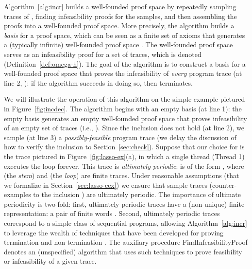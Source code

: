 \documentclass[9pt,nocopyrightspace]{sigplanconf}
\theoremstyle{definition}
\begin{document}
Algorithm~\ref{alg:incr} builds a well-founded proof space by repeatedly
sampling traces of , finding infeasibility proofs for the samples, and then
assembling the proofs into a well-founded proof space.  More precisely, the
algorithm builds a \emph{basis}  for a proof space, which can be seen as a
finite set of axioms that generates a (typically infinite) well-founded proof
space .  The well-founded proof space  serves as an
infeasibility proof for a set of traces, which is denoted
 (Definition~\ref{def:omega-h}).  The goal of the
algorithm is to construct a basis for a well-founded proof space that proves
the infeasibility of \emph{every} program trace (at line 2, ): if the algorithm succeeds in doing so, then  terminates.



We will illustrate the operation of this algorithm on the simple example
pictured in Figure~\ref{fig:incdec}.  The algorithm begins with an empty basis
 (at line 1): the empty basis generates an empty well-founded proof space
 that proves infeasibility of an empty set of traces (i.e.,
).  Since the inclusion  does not hold (at line 2), we sample (at line 3) a
\emph{possibly-feasible} program trace  (we delay the discussion of how to verify the inclusion
 to Section~\ref{sec:check}).  Suppose
that our choice for  is the trace pictured in
Figure~\ref{fig:lasso-ex}(a), in which a single thread (Thread 1) executes the
loop forever.  This trace is \emph{ultimately periodic}:  is of the form
, where  (the \emph{stem}) and  (the
\emph{loop}) are finite traces.  Under reasonable assumptions (that we
formalize in Section~\ref{sec:lasso-cex}) we ensure that sample traces
(counter-examples to the inclusion )
are ultimately periodic.  The importance of ultimate periodicity is two-fold:
first, ultimately periodic traces have a (non-unique) finite representation: a
pair of finite words .  Second, ultimately periodic traces
correspond to a simple class of sequential programs, allowing
Algorithm~\ref{alg:incr} to leverage the wealth of techniques that have been
developed for proving termination
\cite{cav/BradleyMS05,vmcai/PodelskiR04,conf/atva/HeizmannHLP13} and
non-termination \cite{Gupta2008}.  The auxiliary procedure
\textsf{FindInfeasibilityProof} denotes an (unspecified) algorithm that uses
such techniques to prove feasibility or infeasibility of a given trace.
\end{document}

